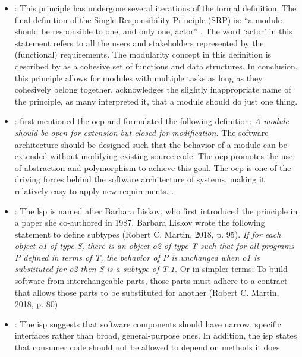 \begin{itemize}
    \item {}: This principle has undergone several iterations of the formal
    definition. The final definition of the Single Responsibility Principle (SRP) is:
    \enquote{a module should be responsible to one, and only one, actor}
    \textcite[82]{r_c_martin_clean_2018}. The word \enquote*{actor} in this statement refers to all
    the users and stakeholders represented by the (functional) requirements. The
    modularity concept in this definition is described by
    \textcite[82]{r_c_martin_clean_2018} as a cohesive set of functions and data
    structures. In conclusion, this principle allows for modules with multiple tasks as
    long as they cohesively belong together. \textcite[81]{r_c_martin_clean_2018}
    acknowledges the slightly inappropriate name of the principle, as many interpreted it,
    that a module should do just one thing.
    \item {}: \textcite{meyer_object-oriented_1988} first mentioned the
    \gls{ocp} and formulated the following definition: \textit{A module should be open for
    extension but closed for modification.} The software architecture should be designed
    such that the behavior of a module can be extended without modifying existing source
    code. The \gls{ocp} promotes the use of abstraction and polymorphism to achieve this
    goal. The \gls{ocp} is one of the driving forces behind the software architecture of
    systems, making it relatively easy to apply new requirements.
    \parencite[94]{r_c_martin_clean_2018}.
    \item {}: The \gls{lsp} is named after Barbara Liskov, who first introduced
    the principle in a paper she co-authored in 1987. Barbara Liskov wrote the following
    statement to define subtypes (Robert C. Martin, 2018, p. 95). \textit{If for each
    object o1 of type S, there is an object o2 of type T such that for all programs P
    defined in terms of T, the behavior of P is unchanged when o1 is substituted for o2
    then S is a subtype of T.1.} Or in simpler terms: To build software from
    interchangeable parts, those parts must adhere to a contract that allows those parts
    to be substituted for another (Robert C. Martin, 2018, p. 80)
    \item {}: The \gls{isp} suggests that software components should have
    narrow, specific interfaces rather than broad, general-purpose ones. In addition, the
    \gls{isp} states that consumer code should not be allowed to depend on methods it does

\end{itemize}
